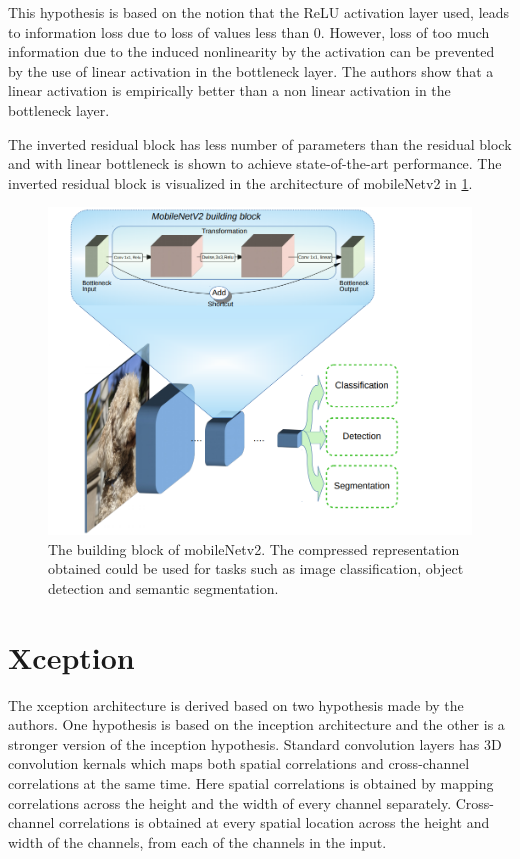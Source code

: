 This hypothesis is based on the notion that the ReLU activation layer used, leads to information loss due to loss of values less than 0. However, loss of too much information due to the induced nonlinearity by the activation can be prevented by the use of linear activation in the bottleneck layer. The authors show that a linear activation is empirically better than a non linear activation in the bottleneck layer.

The inverted residual block has less number of parameters than the residual block and with linear bottleneck is shown to achieve state-of-the-art performance. The inverted residual block is visualized in the architecture of mobileNetv2 in \ref{Fig:mobileNetv2bb}.

	\begin{figure}[!htb]
		\centering
		\includegraphics[width=.7\linewidth]{images/mobileNetv2_bb}
		\caption{The building block of mobileNetv2. The compressed representation obtained could be used for tasks such as image classification, object detection and semantic segmentation.}
		\label{Fig:mobileNetv2bb}
	\end{figure}

\section{Xception}
\label{section:xcep}

The xception architecture is derived based on two hypothesis made by the authors. One hypothesis is based on the inception architecture and the other is a stronger version of the inception hypothesis. Standard convolution layers has 3D convolution kernals which maps both spatial correlations and cross-channel correlations at the same time. Here spatial correlations is obtained by mapping correlations across the height and the width of every channel separately. Cross-channel correlations is obtained at every spatial location across the height and width of the channels, from each of the channels in the input. 

